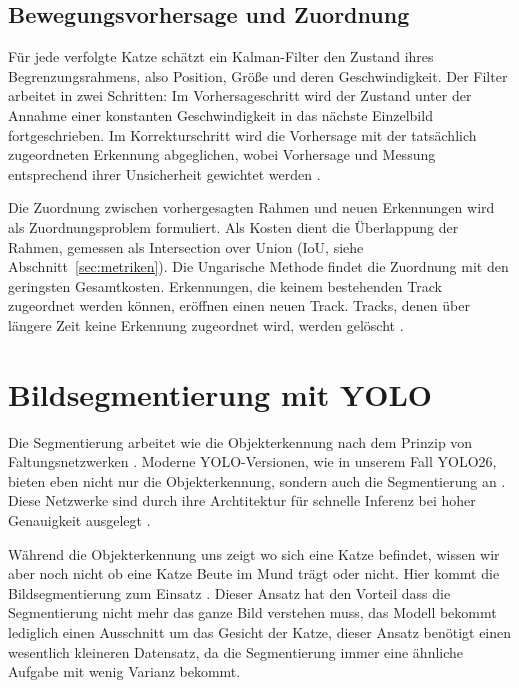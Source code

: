 \subsection{Bewegungsvorhersage und Zuordnung}
\label{subsec:kalman}
Für jede verfolgte Katze schätzt ein Kalman-Filter \cite{kalman1960new} den Zustand ihres Begrenzungsrahmens, also Position, Größe und deren Geschwindigkeit. Der Filter arbeitet in zwei Schritten: Im Vorhersageschritt wird der Zustand unter der Annahme einer konstanten Geschwindigkeit in das nächste Einzelbild fortgeschrieben. Im Korrekturschritt wird die Vorhersage mit der tatsächlich zugeordneten Erkennung abgeglichen, wobei Vorhersage und Messung entsprechend ihrer Unsicherheit gewichtet werden \cite{bewley2016sort}.

Die Zuordnung zwischen vorhergesagten Rahmen und neuen Erkennungen wird als Zuordnungsproblem formuliert. Als Kosten dient die Überlappung der Rahmen, gemessen als Intersection over Union (IoU, siehe Abschnitt~\ref{sec:metriken}). Die Ungarische Methode \cite{kuhn1955hungarian} findet die Zuordnung mit den geringsten Gesamtkosten. Erkennungen, die keinem bestehenden Track zugeordnet werden können, eröffnen einen neuen Track. Tracks, denen über längere Zeit keine Erkennung zugeordnet wird, werden gelöscht \cite{bewley2016sort, zhang2022bytetrack}.
 
\section{Bildsegmentierung mit YOLO}
\label{subsec:yolo_class}

Die Segmentierung arbeitet wie die Objekterkennung nach dem Prinzip von Faltungsnetzwerken \cite{lecun1998gradient, long2015fcn}. Moderne YOLO-Versionen, wie in unserem Fall YOLO26, bieten eben nicht nur die Objekterkennung, sondern auch die Segmentierung an \cite{jocher2024yolo}. Diese Netzwerke sind durch ihre Archtitektur für schnelle Inferenz bei hoher Genauigkeit ausgelegt \cite{bolya2019yolact}.

Während die Objekterkennung uns zeigt wo sich eine Katze befindet, wissen wir aber noch nicht ob eine Katze Beute im Mund trägt oder nicht. Hier kommt die Bildsegmentierung zum Einsatz \cite{minaee2022segmentation, he2017maskrcnn}.
Dieser Ansatz hat den Vorteil dass die Segmentierung nicht mehr das ganze Bild verstehen muss, das Modell bekommt lediglich einen Ausschnitt um das Gesicht der Katze, dieser Ansatz benötigt einen wesentlich kleineren Datensatz, da die Segmentierung immer eine ähnliche Aufgabe mit wenig Varianz bekommt.

